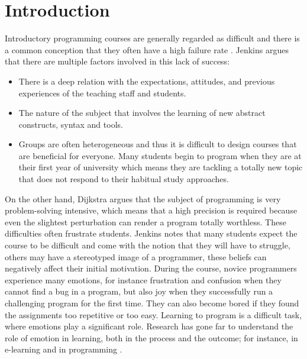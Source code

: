 \documentclass[a4paper,twoside]{article}
\begin{document}
\section{Introduction}

Introductory programming courses are
generally regarded as difficult \cite{robins2003learning, lahtinen2005study} 
and there is a common conception that they often have a high
failure rate \cite{bennedsen2007failure}. Jenkins \cite{jenkins2001motivation} argues that there 
are multiple factors involved in this lack of success: 
\begin{itemize}
\item There is a deep relation with the expectations, attitudes, 
and previous experiences of the teaching staff and students. 
\item The nature of the subject that involves the 
learning of new abstract constructs, syntax and tools.
\item Groups are often heterogeneous and thus it is difficult to design courses 
that are beneficial for everyone. Many students begin to program when they 
are at their first year of university which means they are tackling a totally
new topic that does not respond to their habitual study approaches. 
\end{itemize}

On the other hand, Dijkstra \cite{dijkstra1989cruelty} argues that the subject of programming is very
problem-solving intensive, which means that a high precision is required because even the
slightest perturbation can render a program totally worthless. These
difficulties often frustrate students. 
Jenkins \cite{jenkins2001motivation, jenkins2002difficulty} notes that many
students expect the course to be difficult and come with the notion that they
will have to struggle, others may have a stereotyped image of a programmer,
these beliefs can negatively affect their initial motivation. During the course,
novice programmers experience many emotions, for instance frustration and
confusion when they cannot find a bug in a program, but also joy when they
successfully run a challenging program for the first time. They can also become
bored if they found the assignments too repetitive or too easy. Learning to
program is a difficult task, where emotions play a significant role. Research
has gone far to understand the role of emotion in learning, both in the process
and the outcome; for instance, in e-learning  \cite{kort2001affective, rossin2009effects}
and in programming  \cite{rodrigo2009affective, jenkins2001motivation ,
bosch2013emotions, khan2007mood}.
\end{document}

